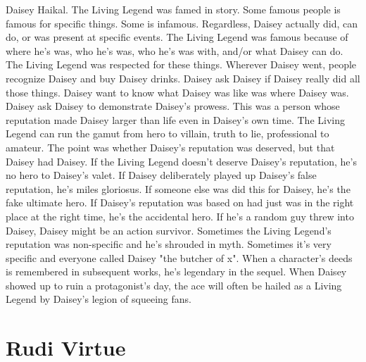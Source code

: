 \documentclass[12pt]{book}
\begin{document}
Daisey Haikal. The Living Legend was famed in story. Some famous people is famous for specific things. Some is infamous. Regardless, Daisey actually did, can do, or was present at specific events. The Living Legend was famous because of where he's was, who he's was, who he's was with, and/or what Daisey can do. The Living Legend was respected for these things. Wherever Daisey went, people recognize Daisey and buy Daisey drinks. Daisey ask Daisey if Daisey really did all those things. Daisey want to know what Daisey was like was where Daisey was. Daisey ask Daisey to demonstrate Daisey's prowess. This was a person whose reputation made Daisey larger than life even in Daisey's own time. The Living Legend can run the gamut from hero to villain, truth to lie, professional to amateur. The point was whether Daisey's reputation was deserved, but that Daisey had Daisey. If the Living Legend doesn't deserve Daisey's reputation, he's no hero to Daisey's valet. If Daisey deliberately played up Daisey's false reputation, he's miles gloriosus. If someone else was did this for Daisey, he's the fake ultimate hero. If Daisey's reputation was based on had just was in the right place at the right time, he's the accidental hero. If he's a random guy threw into Daisey, Daisey might be an action survivor. Sometimes the Living Legend's reputation was non-specific and he's shrouded in myth. Sometimes it's very specific and everyone called Daisey "the butcher of x". When a character's deeds is remembered in subsequent works, he's legendary in the sequel. When Daisey showed up to ruin a protagonist's day, the ace will often be hailed as a Living Legend by Daisey's legion of squeeing fans.



\chapter{Rudi Virtue}
\end{document}
